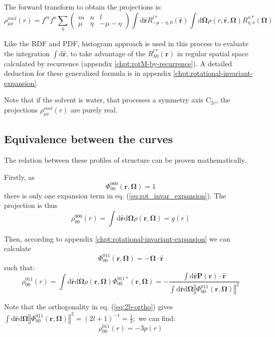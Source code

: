 The forward transform to obtain the projections is:
\begin{equation}
\rho_{\mu\nu}^{mnl}(r)=f^{m}f^{n}\sum_{\eta}\left(\begin{array}{ccc}
m & n & l\\
\mu & \eta & -\mu-\eta
\end{array}\right)\int\mathrm{d}\hat{\mathbf{r}}R_{-\mu-\eta,0}^{l*}(\mathbf{\hat{r}})\int\mathrm{d}\mathbf{\Omega}\rho(r,\hat{\mathbf{r}},\mathbf{\Omega})R_{\eta,\nu}^{n*}(\mathbf{\Omega})
\end{equation}

Like the \acs{RDF} and \acs{PDF}, histogram approach is used in
this process to evaluate the integration $\int\mathrm{d}\hat{\mathbf{r}}$,
to take advantage of the $R_{\lambda0}^{l*}(\mathbf{\hat{r}})$ in
regular spatial space calculated by recurrence (appendix \ref{chpt:rotM-by-recurrence}).
A detailed deduction for these generalized formula is in appendix
\ref{chpt:rotational-invariant-expansion}.

Note that if the solvent is water, that processes a symmetry axis
$\mathrm{C}_{2v}$, the projections $\rho_{\mu\nu}^{mnl}(r)$ are
purely real.

\subsection{Equivalence between the curves}

The relation between these profiles of structure can be proven mathematically.

Firstly, as
\begin{equation}
\Phi_{00}^{000}(\mathbf{r},\mathbf{\Omega})=1
\end{equation}
there is only one expansion term in eq. (\ref{eq:rot_invar_expansion}).
The projection is thus
\begin{equation}
\rho_{00}^{000}(r)=\int\mathrm{d}\hat{\mathbf{r}}\mathrm{d}\mathbf{\Omega}\rho(\mathbf{r},\mathbf{\Omega})=g(r)
\end{equation}

Then, according to appendix \ref{chpt:rotational-invariant-expansion}
we can calculate
\begin{equation}
\Phi_{00}^{011}(\mathbf{r},\mathbf{\Omega})=-\mathbf{\Omega}\cdot\hat{\mathbf{r}}
\end{equation}
such that:
\begin{equation}
\rho_{00}^{011}(r)=\int\mathrm{d}\hat{\mathbf{r}}\mathrm{d}\mathbf{\Omega}\rho(\mathbf{r},\mathbf{\Omega})\Phi_{00}^{011*}(\mathbf{r},\mathbf{\Omega})=-\dfrac{\int\mathrm{d}\hat{\mathbf{r}}\mathbf{P}(\mathbf{r})\cdot\hat{\mathbf{r}}}{\int\mathrm{d}\hat{\mathbf{r}}\mathrm{d}\mathbf{\Omega}\left\Vert \Phi_{00}^{011}(\mathbf{r},\mathbf{\Omega})\right\Vert ^{2}}
\end{equation}

Note that the orthogonality in eq. (\ref{eq:2b-ortho}) gives $\int\mathrm{d}\hat{\mathbf{r}}\mathrm{d}\mathbf{\Omega}\left\Vert \Phi_{00}^{011}(\mathbf{r},\mathbf{\Omega})\right\Vert ^{2}=\left(2l+1\right)^{-1}=\frac{1}{3};$
we can find:
\begin{equation}
\rho_{00}^{011}(r)=-3p(r)
\end{equation}

